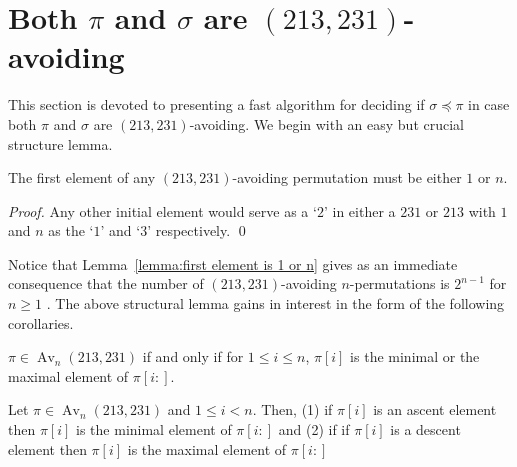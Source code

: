 \documentclass[a4paper]{llncs}
\DeclareMathOperator{\AV}{Av}
\DeclareMathOperator{\Avd}{Av}
\newcommand\Av[2]{\Avd_{{#1}}({#2})}
\DeclareMathOperator{\stripea}{s}
\newcommand{\stripe}[2]{\stripea_{{#1}}[{#2}]}
\newcounter{num}
\newcommand{\dstep}{d}
\newcommand{\ustep}{a}
\begin{document}


\section{Both $\pi$ and $\sigma$ are $(213,231)$-avoiding}
\label{section:both are (213,231)-avoiding}

This section is devoted to presenting a fast algorithm for deciding if
$\sigma \preceq \pi$
in case both $\pi$ and $\sigma$ are $(213,231)$-avoiding.
We begin with an easy but crucial structure lemma.

\begin{lemma}[Folklore]
\label{lemma:first element is 1 or n}
The first element of any $(213,231)$-avoiding permutation
must be either $1$ or $n$.
\end{lemma}

\begin{proof}
Any other initial element would serve as a `$2$' in either a
$231$ or $213$ with $1$ and $n$ as the `$1$' and `$3$' respectively.
\qed
\end{proof}

Notice that Lemma~\ref{lemma:first element is 1 or n} gives as an
immediate consequence that the number of $(213,231)$-avoiding $n$-permutations
is $2^{n-1}$ for $n\geq 1$ \cite{Simion:Schmidt:EJC:1985}.
The above structural lemma gains in interest in the form of the following corollaries.

\begin{corollary}
\label{corollary:minmaxelement}
$\pi \in \AV_n(213,231)$ if and only if for $1 \leq i \leq n$,
$\pi[i]$ is the minimal or the maximal element of $\pi[i:]$.
\end{corollary}

\begin{corollary}
\label{corollary:max is ascent}
Let $\pi \in \AV_n(213,231)$ and $1 \leq i < n$. Then,
(1) 
if $\pi[i]$ is an ascent element then $\pi[i]$ is the minimal element 
of $\pi[i:]$
and 
(2)
if if $\pi[i]$ is a descent element then $\pi[i]$ is the maximal element 
of $\pi[i:]$
\end{corollary}

%
\end{document}
